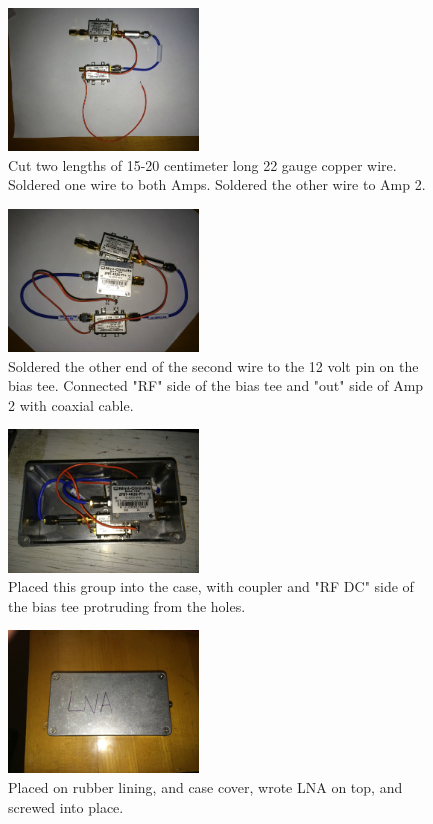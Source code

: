 \documentclass[11pt]{article} %
\begin{document}
\begin{figure}
  \centering
  \caption{Cut two lengths of 15-20 centimeter long 22 gauge copper wire.  Soldered one wire to both Amps. Soldered the other wire to Amp 2. }
  \includegraphics[width=0.45\textwidth]{lna/04.jpeg}
\end{figure}


\begin{figure}
  \centering
  \caption{Soldered the other end of the second wire to the 12 volt pin on the bias tee. Connected "RF" side of the bias tee and "out" side of Amp 2 with coaxial cable. }
  \includegraphics[width=0.45\textwidth]{lna/05.jpeg}
\end{figure}


\begin{figure}
  \centering
  \caption{Placed this group into the case, with coupler and "RF DC" side of the bias tee protruding from the holes. }
  \includegraphics[width=0.45\textwidth]{lna/06.jpeg}
\end{figure}


\begin{figure}
  \centering
  \caption{Placed on rubber lining, and case cover, wrote LNA on top, and screwed into place.}
  \includegraphics[width=0.45\textwidth]{lna/07.jpeg}
\end{figure}
\end{document}
